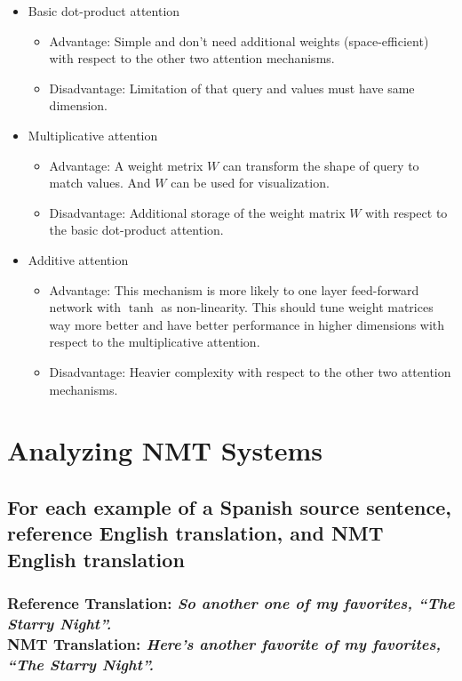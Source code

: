 \documentclass[12pt, letterpaper]{article}
\begin{document}
\begin{itemize}
  \item Basic dot-product attention {
    \begin{itemize}
      \item Advantage: Simple and don't need additional weights (space-efficient) with respect to the other two attention mechanisms.
      \item Disadvantage: Limitation of that query and values must have same dimension.
    \end{itemize}
  }
  \item Multiplicative attention {
    \begin{itemize}
      \item Advantage: A weight metrix $W$ can transform the shape of query to match values. And $W$ can be used for visualization.
      \item Disadvantage: Additional storage of the weight matrix $W$ with respect to the basic dot-product attention.
    \end{itemize}
  }
  \item Additive attention {
    \begin{itemize}
      \item Advantage: This mechanism is more likely to one layer feed-forward network with $\tanh$ as non-linearity. This should tune weight matrices way more better and have better performance in higher dimensions with respect to the multiplicative attention.
      \item Disadvantage: Heavier complexity with respect to the other two attention mechanisms.
    \end{itemize}
  }
\end{itemize}

\section{Analyzing NMT Systems}
\subsection{For each example of a Spanish source sentence, reference English translation, and NMT English translation}
\subsubsection{\textbf{Reference Translation}: \textit{So another one of my favorites, “The Starry Night”.} \\ \textbf{NMT Translation}: \textit{Here’s another favorite of my favorites, “The Starry Night”.}}
\end{document}
